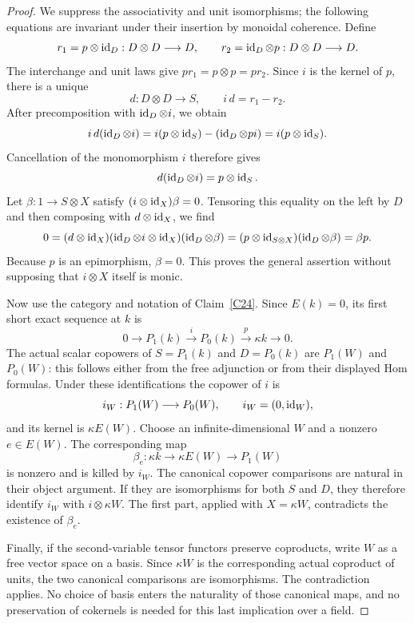 \begin{proof}
We suppress the associativity and unit isomorphisms; the following equations are invariant under their insertion by monoidal coherence. Define
\[
r_1=p\otimes\operatorname{id}_D:D\otimes D\longrightarrow D,
\qquad
r_2=\operatorname{id}_D\otimes p:D\otimes D\longrightarrow D.
\]
The interchange and unit laws give $pr_1=p\otimes p=pr_2$. Since $i$ is the kernel of $p$, there is a unique
\[
d:D\otimes D\longrightarrow S,
\qquad i\,d=r_1-r_2.
\]
After precomposition with $\operatorname{id}_D\otimes i$, we obtain
\[
i\,d(\operatorname{id}_D\otimes i)
=i(p\otimes\operatorname{id}_S)-(\operatorname{id}_D\otimes pi)
=i(p\otimes\operatorname{id}_S).
\]
Cancellation of the monomorphism $i$ therefore gives
\[
d(\operatorname{id}_D\otimes i)=p\otimes\operatorname{id}_S.
\]
Let $\beta:1\to S\otimes X$ satisfy $(i\otimes\operatorname{id}_X)\beta=0$. Tensoring this equality on the left by $D$ and then composing with $d\otimes\operatorname{id}_X$, we find
\[
0=(d\otimes\operatorname{id}_X)(\operatorname{id}_D\otimes i\otimes\operatorname{id}_X)
  (\operatorname{id}_D\otimes\beta)
 =(p\otimes\operatorname{id}_{S\otimes X})(\operatorname{id}_D\otimes\beta)
 =\beta p.
\]
Because $p$ is an epimorphism, $\beta=0$. This proves the general assertion without supposing that $i\otimes X$ itself is monic.

Now use the category and notation of Claim~\ref{C24}. Since $E(k)=0$, its first short exact sequence at $k$ is
\[
0\longrightarrow P_1(k)\xrightarrow{i}P_0(k)
\xrightarrow{p}\kappa k\longrightarrow0.
\]
The actual scalar copowers of $S=P_1(k)$ and $D=P_0(k)$ are $P_1(W)$ and $P_0(W)$: this follows either from the free adjunction or from their displayed Hom formulas. Under these identifications the copower of $i$ is
\[
i_W:P_1(W)\longrightarrow P_0(W),\qquad i_W=(0,\operatorname{id}_W),
\]
and its kernel is $\kappa E(W)$. Choose an infinite-dimensional $W$ and a nonzero $e\in E(W)$. The corresponding map
\[
\beta_e:\kappa k\longrightarrow\kappa E(W)
\longrightarrow P_1(W)
\]
is nonzero and is killed by $i_W$. The canonical copower comparisons are natural in their object argument. If they are isomorphisms for both $S$ and $D$, they therefore identify $i_W$ with $i\otimes\kappa W$. The first part, applied with $X=\kappa W$, contradicts the existence of $\beta_e$.

Finally, if the second-variable tensor functors preserve coproducts, write $W$ as a free vector space on a basis. Since $\kappa W$ is the corresponding actual coproduct of units, the two canonical comparisons are isomorphisms. The contradiction applies. No choice of basis enters the naturality of those canonical maps, and no preservation of cokernels is needed for this last implication over a field.
\end{proof}


